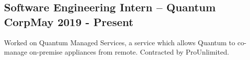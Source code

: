 \documentclass[../Resume.tex]{subfiles}
\begin{document}
    \subsection{Software Engineering Intern -- Quantum Corp\null\hfill May 2019 - Present}
    \par Worked on Quantum Managed Services, a service which allows Quantum to co-manage on-premise appliances from remote.
    Contracted by ProUnlimited.
    \vspace*{-2mm}
\end{document}

